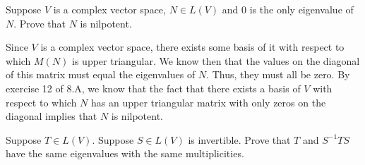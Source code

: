 \begin{exercise}{1}
    Suppose $V$ is a complex vector space, $N \in L(V)$ and 0 is the only eigenvalue of $N$. Prove that $N$ is nilpotent.
\end{exercise}

\begin{solution}

    Since $V$ is a complex vector space, there exists some basis of it with respect to which $M(N)$ is upper triangular. We know then that the values on the diagonal of this matrix must equal the eigenvalues of $N$. Thus, they must all be zero. By exercise 12 of 8.A, we know that the fact that there exists a basis of $V$ with respect to which $N$ has an upper triangular matrix with only zeros on the diagonal implies that $N$ is nilpotent.
\end{solution}

\begin{exercise}{3}
    Suppose $T \in L(V)$. Suppose $S \in L(V)$ is invertible. Prove that $T$ and $S^{-1}TS$ have the same eigenvalues with the same multiplicities.
\end{exercise}

